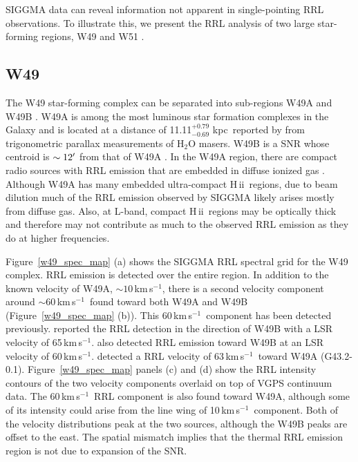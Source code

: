 \documentclass[manuscript]{aastex61}
\newcommand{\hii}{{\rm H\,}{{\sc ii}}}
\newcommand{\kms}{\,km\,s$^{-1}$}
\newcommand{\kpc}{\,kpc}
\begin{document}
SIGGMA data can reveal information not apparent in single-pointing RRL observations.
To illustrate this, we present the RRL analysis of two large star-forming regions, W49 and W51 \citep{Westerhout1958}.

\subsection{W49}
The W49 star-forming complex can be separated into sub-regions W49A and W49B \citep{Mezger1967c}.
W49A is among the most luminous star formation complexes in the Galaxy and is located at a distance of 11.11$^{+0.79}_{-0.69}$\,\kpc\ reported by \citet{Zhang2013} from trigonometric parallax measurements of H$_{2}$O masers.
W49B is a SNR whose centroid is $\sim12\mbox{$^\prime$}$ from that of W49A \citep{Lacey2001}.
In the W49A region, there are compact radio sources with RRL emission that are embedded in diffuse ionized gas \citep{Depree1997,Depree2003}.
Although W49A has many embedded ultra-compact \hii\ regions, due to beam dilution much of the RRL emission observed by SIGGMA likely arises mostly from diffuse gas.
Also, at L-band, compact \hii\ regions may be optically thick and therefore may not contribute as much to the observed RRL emission as they do at higher frequencies.

Figure~\ref{w49_spec_map} (a) shows the SIGGMA RRL spectral grid for the W49 complex.
RRL emission is detected over the entire region.
In addition to the known velocity of W49A, $\sim10$\kms, there is a second velocity component around $\sim60$\kms\ found toward both W49A and W49B (Figure~\ref{w49_spec_map} (b)).
This 60\kms\ component has been detected previously.
\citet{Downes1974} reported the RRL detection in the direction of W49B with a LSR velocity of 65\kms.
\citet{Pankonin1975} also detected RRL emission toward W49B at an LSR velocity of 60\kms.
\citet{Anantharamaiah1986} detected a RRL velocity of 63\kms\ toward W49A (G43.2-0.1).
Figure~\ref{w49_spec_map} panels (c) and (d) show the RRL intensity contours of the two velocity components overlaid on top of VGPS continuum data.
The 60\kms\ RRL component is also found toward W49A, although some of its intensity could arise from the line wing of 10\kms\ component.
Both of the velocity distributions peak at the two sources, although the W49B peaks are offset to the east.
The spatial mismatch implies that the thermal RRL emission region is not due to expansion of the SNR.
\end{document}
